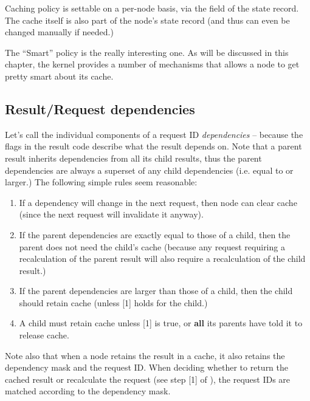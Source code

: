   Caching policy is settable on a per-node basis, via the 
  field of the state record. The cache itself is also part of the node's state
  record (and thus can even be changed manually if needed.)

  The ``Smart'' policy is the really interesting one. As will be discussed
  in this chapter, the kernel provides a number of mechanisms that allows a node
  to get pretty smart about its cache.
  
\subsection{Result/Request dependencies}

  

  Let's call the individual components of a request ID {\em dependencies} --
  because the  flags in the result code describe what the result
  depends on. Note that a parent result inherits dependencies from all its
  child results, thus the parent dependencies are always a superset of any
  child dependencies (i.e. equal to or larger.) The following simple rules seem
  reasonable:

  \begin{enumerate}
  
  \item If a dependency will change in the next request, then node can clear
    cache (since the next request will invalidate it anyway).

  \item If the parent dependencies are exactly equal to those of a child, then
    the parent does not need the child's cache (because any request requiring a
    recalculation of the parent result will also require a recalculation of the
    child result.)

  \item If the parent dependencies are larger than those of a child, then the 
    child should retain cache (unless [1] holds for the child.) 

  \item A child must retain cache unless [1] is true, or {\bf all} its parents
    have told it to release cache.

  \end{enumerate}
  
  Note also that when a node retains the result in a cache, it also retains the
  dependency mask and the request ID. When deciding whether to return the
  cached result or recalculate the request (see step [1] of ),
  the request IDs are matched according to the dependency mask.



